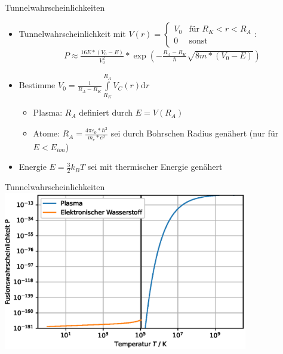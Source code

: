 \begin{frame}{Tunnelwahrscheinlichkeiten}
    \begin{itemize}
        \item<+-> Tunnelwahrscheinlichkeit mit $V(r) = \begin{cases}V_0 & \text{für } R_K < r < R_A \\ 0 & \text{sonst}\end{cases}$:
        \begin{align*}
            P \approx \frac{16 E * (V_0 - E)}{V_0^2} * \exp\left(- \frac{R_A - R_K}{\hbar} \sqrt{8m*(V_0 - E)}\right)
        \end{align*}
        \item<+-> Bestimme $V_0 = \frac{1}{R_A - R_K} \int\limits_{R_K}^{R_A} V_C(r) \mathrm{d}r$
        \begin{itemize}
            \item<+-> Plasma: $R_A$ definiert durch $E = V(R_A)$
            \item<+-> Atome: $R_A = \frac{4\pi\varepsilon_0 * \hbar^2}{m_e * e^2}$ sei durch Bohrschen Radius genähert (nur für $E < E_{ion}$)
        \end{itemize}
        \item<+-> Energie $E = \frac{3}{2} k_B T$ sei mit thermischer Energie genähert
    \end{itemize}
\end{frame}

\begin{frame}{Tunnelwahrscheinlichkeiten}
    \centering
    \includegraphics[width=0.8\textwidth]{images/Tunnelwahrscheinlichkeiten1.eps}
\end{frame}
